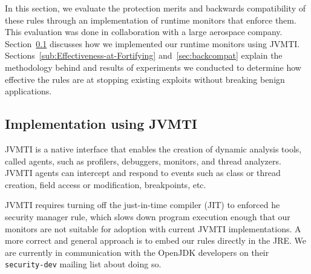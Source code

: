 \documentclass{sig-alternate}
\newcommand{\clg}[1]{\todo[color=yellow]{CLG: #1}}
\begin{document}


In this section, we evaluate the protection merits and backwards compatibility
of these rules through an implementation of runtime monitors that
enforce them. This evaluation was done in collaboration with a large aerospace
company.
Section~\ref{sub:Implementation-Using-JVMTI} discusses how we implemented
our runtime monitors using JVMTI. Sections~\ref{sub:Effectiveness-at-Fortifying} and~\ref{sec:backcompat} explain the methodology behind and results of experiments we conducted
to determine how effective the rules are at stopping existing exploits without
breaking benign applications. 

\subsection{Implementation using JVMTI}\label{sub:Implementation-Using-JVMTI}

JVMTI is a native interface that enables the creation of
dynamic analysis tools, called agents, such as profilers, debuggers, monitors, and thread
analyzers. JVMTI agents can intercept and respond to events such as class
or thread creation, field access or modification, breakpoints, etc.

JVMTI requires turning off the just-in-time compiler (JIT) to enforced
he security manager rule, which slows down program
execution enough that our monitors are not suitable for adoption with current 
JVMTI implementations. %
A more correct and general approach is to embed our
rules directly in the JRE.  We are currently in communication 
with the OpenJDK developers on their \texttt{security-dev} mailing list about
doing so.
\end{document}
